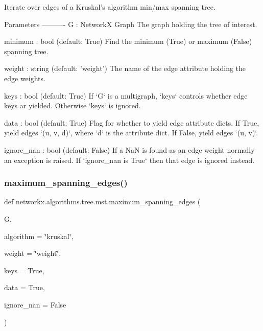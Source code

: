 \begin{DoxyVerb}Iterate over edges of a Kruskal's algorithm min/max spanning tree.

Parameters
----------
G : NetworkX Graph
    The graph holding the tree of interest.

minimum : bool (default: True)
    Find the minimum (True) or maximum (False) spanning tree.

weight : string (default: 'weight')
    The name of the edge attribute holding the edge weights.

keys : bool (default: True)
    If `G` is a multigraph, `keys` controls whether edge keys ar yielded.
    Otherwise `keys` is ignored.

data : bool (default: True)
    Flag for whether to yield edge attribute dicts.
    If True, yield edges `(u, v, d)`, where `d` is the attribute dict.
    If False, yield edges `(u, v)`.

ignore_nan : bool (default: False)
    If a NaN is found as an edge weight normally an exception is raised.
    If `ignore_nan is True` then that edge is ignored instead.\end{DoxyVerb}
 \mbox{\label{namespacenetworkx_1_1algorithms_1_1tree_1_1mst_affed092b6a627eb15629fe61ff1bec9d}} 
\subsubsection{\texorpdfstring{maximum\+\_\+spanning\+\_\+edges()}{maximum\_spanning\_edges()}}
{\footnotesize\ttfamily def networkx.\+algorithms.\+tree.\+mst.\+maximum\+\_\+spanning\+\_\+edges (\begin{DoxyParamCaption}\item[{}]{G,  }\item[{}]{algorithm = {\ttfamily \char`\"{}kruskal\char`\"{}},  }\item[{}]{weight = {\ttfamily \char`\"{}weight\char`\"{}},  }\item[{}]{keys = {\ttfamily True},  }\item[{}]{data = {\ttfamily True},  }\item[{}]{ignore\+\_\+nan = {\ttfamily False} }\end{DoxyParamCaption})}

